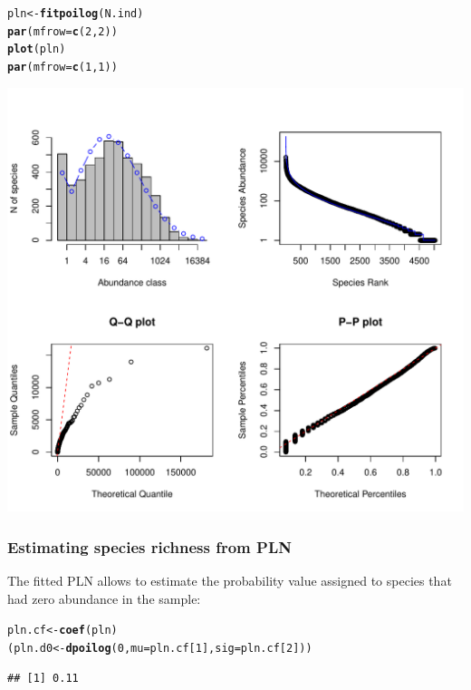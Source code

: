\documentclass[12pt, A4]{article}\usepackage[]{graphicx}\usepackage[]{color}
\makeatletter
\def\maxwidth{ %
  \ifdim\Gin@nat@width>\linewidth
    \linewidth
  \else
    \Gin@nat@width
  \fi
}
\newcommand{\hlnum}[1]{\textcolor[rgb]{0.686,0.059,0.569}{#1}}%
\newcommand{\hlstd}[1]{\textcolor[rgb]{0.345,0.345,0.345}{#1}}%
\newcommand{\hlkwb}[1]{\textcolor[rgb]{0.69,0.353,0.396}{#1}}%
\newcommand{\hlkwc}[1]{\textcolor[rgb]{0.333,0.667,0.333}{#1}}%
\newcommand{\hlkwd}[1]{\textcolor[rgb]{0.737,0.353,0.396}{\textbf{#1}}}%
\newenvironment{kframe}{%
 \def\at@end@of@kframe{}%
 \ifinner\ifhmode%
  \def\at@end@of@kframe{\end{minipage}}%
  \begin{minipage}{\columnwidth}%
 \fi\fi%
 \def\FrameCommand##1{\hskip\@totalleftmargin \hskip-\fboxsep
 \colorbox{shadecolor}{##1}\hskip-\fboxsep
     \hskip-\linewidth \hskip-\@totalleftmargin \hskip\columnwidth}%
 \MakeFramed {\advance\hsize-\width
   \@totalleftmargin\z@ \linewidth\hsize
   \@setminipage}}%
 {\par\unskip\endMakeFramed%
 \at@end@of@kframe}
\newenvironment{knitrout}{}{} %
\makeatother
\begin{document}
\begin{knitrout}
\color{fgcolor}\begin{kframe}
\begin{alltt}
\hlstd{pln} \hlkwb{<-} \hlkwd{fitpoilog}\hlstd{(N.ind)}
\hlkwd{par}\hlstd{(}\hlkwc{mfrow}\hlstd{=}\hlkwd{c}\hlstd{(}\hlnum{2}\hlstd{,}\hlnum{2}\hlstd{))}
\hlkwd{plot}\hlstd{(pln)}
\hlkwd{par}\hlstd{(}\hlkwc{mfrow}\hlstd{=}\hlkwd{c}\hlstd{(}\hlnum{1}\hlstd{,}\hlnum{1}\hlstd{))}
\end{alltt}
\end{kframe}

{\centering \includegraphics[width=\maxwidth]{figure/fit_pln-1} 

}



\end{knitrout}


\subsubsection*{Estimating species richness from PLN}

The fitted PLN allows to estimate the probability value assigned to species that
had zero abundance in the sample:

\begin{knitrout}
\color{fgcolor}\begin{kframe}
\begin{alltt}
\hlstd{pln.cf} \hlkwb{<-} \hlkwd{coef}\hlstd{(pln)}
\hlstd{(pln.d0} \hlkwb{<-} \hlkwd{dpoilog}\hlstd{(}\hlnum{0}\hlstd{,} \hlkwc{mu} \hlstd{= pln.cf[}\hlnum{1}\hlstd{],} \hlkwc{sig}\hlstd{=pln.cf[}\hlnum{2}\hlstd{]))}
\end{alltt}
\begin{verbatim}
## [1] 0.11
\end{verbatim}
\end{kframe}
\end{knitrout}
\end{document}
